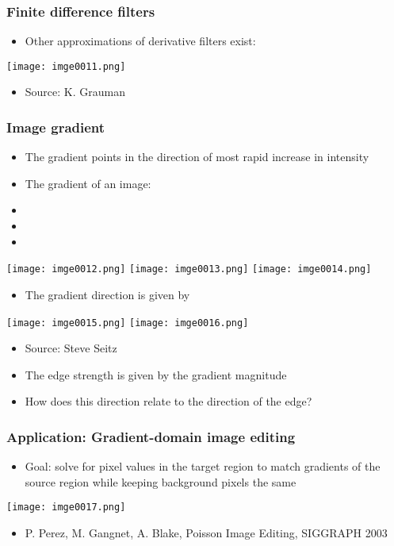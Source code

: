 \begin{frame}
\frametitle{Finite difference filters}
\begin{itemize}
\item Other approximations of derivative filters exist:
\end{itemize}
\texttt{[image: imge0011.png]}
\begin{itemize}
\item Source: K. Grauman
\end{itemize}

\end{frame}


\begin{frame}
\frametitle{Image gradient}
\begin{itemize}
\item The gradient points in the direction of most rapid increase in intensity
\end{itemize}
\begin{itemize}
\item The gradient of an image:
\item
\item
\item
\end{itemize}
\texttt{[image: imge0012.png]}
\texttt{[image: imge0013.png]}
\texttt{[image: imge0014.png]}
\begin{itemize}
\item The gradient direction is given by
\end{itemize}
\texttt{[image: imge0015.png]}
\texttt{[image: imge0016.png]}
\begin{itemize}
\item Source: Steve Seitz
\end{itemize}
\begin{itemize}
\item The edge strength is given by the gradient magnitude
\end{itemize}
\begin{itemize}
\item How does this direction relate to the direction of the edge?
\end{itemize}

\end{frame}


\begin{frame}
\frametitle{Application: Gradient-domain image editing}
\begin{itemize}
\item Goal: solve for pixel values in the target region to match gradients of the source region while keeping background pixels the same
\end{itemize}
\texttt{[image: imge0017.png]}
\begin{itemize}
\item P. Perez, M. Gangnet, A. Blake, Poisson Image Editing, SIGGRAPH 2003
\end{itemize}

\end{frame}



